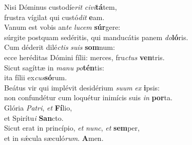 \evenverse Nisi Dóminus custodíe\textit{rit} \textit{ci}\textit{vi}\textbf{tá}tem,~\*\\
\evenverse frustra vígilat qui custó\textit{dit} \textbf{e}am.\\
\oddverse Vanum est vobis an\textit{te} \textit{lu}\textit{cem} \textbf{súr}gere:~\*\\
\oddverse súrgite postquam sedéritis, qui manducátis panem \textit{do}\textbf{ló}ris.\\
\evenverse Cum déderit dilé\textit{ctis} \textit{su}\textit{is} \textbf{som}num:~\*\\
\evenverse ecce heréditas Dómini fílii: merces, fru\textit{ctus} \textbf{ven}tris.\\
\oddverse Sicut sagíttæ in \textit{ma}\textit{nu} \textit{po}\textbf{tén}tis:~\*\\
\oddverse ita fílii ex\textit{cus}\textbf{só}rum.\\
\evenverse Beátus vir qui implévit desidérium \textit{su}\textit{um} \textit{ex} \textbf{i}psis:~\*\\
\evenverse non confundétur cum loquétur inimícis suis \textit{in} \textbf{por}ta.\\
\oddverse Glória \textit{Pa}\textit{tri}, \textit{et} \textbf{Fí}lio,~\*\\
\oddverse et Spirítu\textit{i} \textbf{San}cto.\\
\evenverse Sicut erat in princípio, \textit{et} \textit{nunc}, \textit{et} \textbf{sem}per,~\*\\
\evenverse et in sǽcula sæculó\textit{rum}. \textbf{A}men.\\
